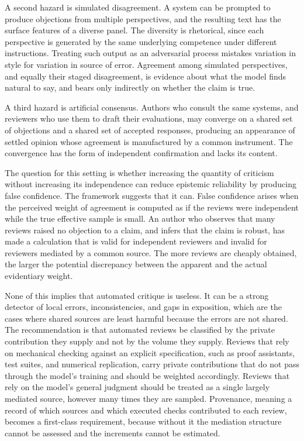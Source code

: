 \documentclass[11pt]{article}
\theoremstyle{remark}
\begin{document}
A second hazard is simulated disagreement. A system can be prompted to produce objections from multiple perspectives, and the resulting text has the surface features of a diverse panel. The diversity is rhetorical, since each perspective is generated by the same underlying competence under different instructions. Treating such output as an adversarial process mistakes variation in style for variation in source of error. Agreement among simulated perspectives, and equally their staged disagreement, is evidence about what the model finds natural to say, and bears only indirectly on whether the claim is true.

A third hazard is artificial consensus. Authors who consult the same systems, and reviewers who use them to draft their evaluations, may converge on a shared set of objections and a shared set of accepted responses, producing an appearance of settled opinion whose agreement is manufactured by a common instrument. The convergence has the form of independent confirmation and lacks its content.

The question for this setting is whether increasing the quantity of criticism without increasing its independence can reduce epistemic reliability by producing false confidence. The framework suggests that it can. False confidence arises when the perceived weight of agreement is computed as if the reviews were independent while the true effective sample is small. An author who observes that many reviews raised no objection to a claim, and infers that the claim is robust, has made a calculation that is valid for independent reviewers and invalid for reviewers mediated by a common source. The more reviews are cheaply obtained, the larger the potential discrepancy between the apparent and the actual evidentiary weight.

None of this implies that automated critique is useless. It can be a strong detector of local errors, inconsistencies, and gaps in exposition, which are the cases where shared sources are least harmful because the errors are not shared. The recommendation is that automated reviews be classified by the private contribution they supply and not by the volume they supply. Reviews that rely on mechanical checking against an explicit specification, such as proof assistants, test suites, and numerical replication, carry private contributions that do not pass through the model's training and should be weighted accordingly. Reviews that rely on the model's general judgment should be treated as a single largely mediated source, however many times they are sampled. Provenance, meaning a record of which sources and which executed checks contributed to each review, becomes a first-class requirement, because without it the mediation structure cannot be assessed and the increments cannot be estimated.
\end{document}
